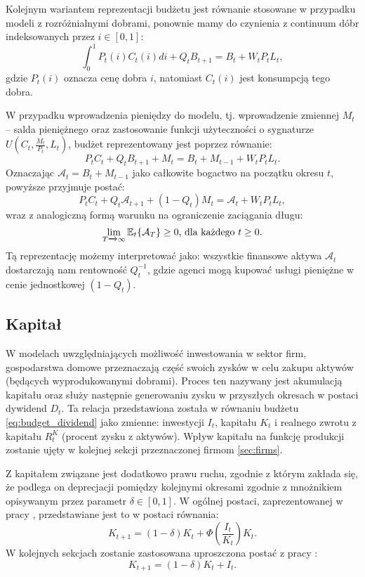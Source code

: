 Kolejnym wariantem reprezentacji budżetu jest równanie stosowane w przypadku modeli z rozróżnialnymi dobrami, ponownie mamy do czynienia z continuum dóbr indeksowanych przez $i \in [0,1]$:
\begin{equation*}
    \int_0^1 P_t(i)C_t(i)di + Q_t B_{t+1} = B_t + W_t P_t L_t,
\end{equation*}
gdzie $P_t(i)$ oznacza cenę dobra $i$, natomiast $C_t(i)$ jest konsumpcją tego dobra.

W przypadku wprowadzenia pieniędzy do modelu, tj. wprowadzenie zmiennej $M_t$ -- salda pieniężnego oraz zastosowanie funkcji użyteczności o sygnaturze $U(C_t, \frac{M_t}{P_t}, L_t)$, budżet reprezentowany jest poprzez równanie:
\begin{equation}
    P_t C_t + Q_t B_{t+1} + M_t = B_{t} + M_{t-1} + W_t P_t L_t.
\end{equation}
Oznaczając $\mathcal{A}_t = B_{t} + M_{t-1}$ jako całkowite bogactwo na początku okresu $t$, powyższe przyjmuje postać:
\begin{equation}
    P_t C_t + Q_t \mathcal{A}_{t+1} + (1-Q_t)M_t = \mathcal{A}_t + W_t P_t L_t,
\end{equation}
wraz z analogiczną formą warunku na ograniczenie zaciągania długu:
\begin{equation}
    \lim_{T\xrightarrow{}\infty}\mathbb{E}_t\{\mathcal{A}_T\} \geq 0 \text{, dla każdego } t \ge 0.
\end{equation}
Tą reprezentację możemy interpretować jako: wszystkie finansowe aktywa $\mathcal{A}_t$ dostarczają nam rentowność $Q^{-1}_t$, gdzie agenci mogą kupować usługi pieniężne w cenie jednostkowej $(1-Q_t)$.

\subsection{Kapitał}

W modelach uwzględniających możliwość inwestowania w sektor firm, gospodarstwa domowe przeznaczają część swoich zysków w celu zakupu aktywów (będących wyprodukowanymi dobrami). Proces ten nazywany jest akumulacją kapitału oraz służy następnie generowaniu zysku w przyszłych okresach w postaci dywidend $D_t$. Ta relacja przedstawiona została w równaniu budżetu \eqref{eq:budget_dividend} jako zmienne: inwestycji $I_t$, kapitału $K_t$ i realnego zwrotu z kapitału $R^K_t$ (procent zysku z aktywów). Wpływ kapitału na funkcję produkcji zostanie ujęty w kolejnej sekcji przeznaczonej firmom \ref{sec:firms}.

Z kapitałem związane jest dodatkowo prawu ruchu, zgodnie z którym zakłada się, że podlega on deprecjacji pomiędzy kolejnymi okresami zgodnie z mnożnikiem opisywanym przez parametr $\delta \in [0,1]$. W ogólnej postaci, zaprezentowanej w pracy \cite{gali_gov_spending}, przedstawiane jest to w postaci równania:
\begin{equation}
    K_{t+1} = (1-\delta)K_t + \Phi(\frac{I_t}{K_t})K_t.
\end{equation}
W kolejnych sekcjach zostanie zastosowana uproszczona postać z pracy \cite{COSTAJUNIOR2018424}:
\begin{equation}
    K_{t+1} = (1-\delta)K_t + I_t.
\end{equation}

